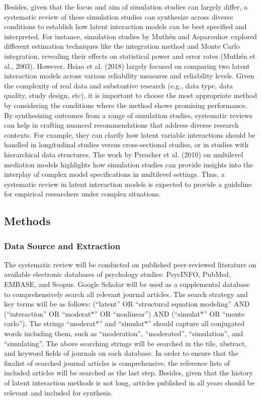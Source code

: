 \documentclass[
  man]{apa6}
\begin{document}
Besides, given that the focus and aim of simulation studies can largely differ, a systematic review of these simulation studies can synthesize across diverse conditions to establish how latent interaction models can be best specified and interpreted. For instance, simulation studies by Muthén and Asparouhov explored different estimation techniques like the integration method and Monte Carlo integration, revealing their effects on statistical power and error rates (Muthén et al., 2003). However, Hsiao et al. (2018) largely focused on comparing two latent interaction models across various reliability measures and reliability levels. Given the complexity of real data and substantive research (e.g., data type, data quality, study design, etc), it is important to choose the most appropriate method by considering the conditions where the method shows promising performance. By synthesizing outcomes from a range of simulation studies, systematic reviews can help in crafting nuanced recommendations that address diverse research contexts. For example, they can clarify how latent variable interactions should be handled in longitudinal studies versus cross-sectional studies, or in studies with hierarchical data structures. The work by Preacher et al. (2010) on multilevel mediation models highlights how simulation studies can provide insights into the interplay of complex model specifications in multilevel settings. Thus, a systematic review in latent interaction models is expected to provide a guideline for empirical researchers under complex situations.

\hypertarget{methods}{%
\subsection{Methods}\label{methods}}

\hypertarget{data-source-and-extraction}{%
\subsubsection{Data Source and Extraction}\label{data-source-and-extraction}}

The systematic review will be conducted on published peer-reviewed literature on available electronic databases of psychology studies: PsycINFO, PubMed, EMBASE, and Scopus. Google Scholar will be used as a supplemental database to comprehensively search all relevant journal articles. The search strategy and key terms will be as follows: (``latent'' OR ``structural equation modeling'' AND (``interaction'' OR ``moderat\(\text{*}\)'' OR ``nonlinear'') AND (``simulat\(\text{*}\)'' OR ``monte carlo''). The strings ``moderat\(\text{*}\)'' and ``simulat\(\text{*}\)'' should capture all conjugated words including them, such as ``moderation'', ``moderated'', ``simulation'', and ``simulating''. The above searching strings will be searched in the tile, abstract, and keyword fields of journals on each database. In order to ensure that the finalist of searched journal articles is comprehensive, the reference lists of included articles will be searched as the last step. Besides, given that the history of latent interaction methods is not long, articles published in all years should be relevant and included for synthesis.
\end{document}
